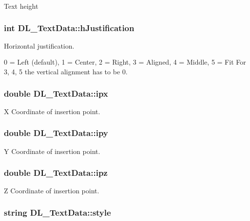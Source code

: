 Text height \hypertarget{structDL__TextData_a9c6bfbf0d57c1b5d33714236ea6ffa56}{
\subsubsection[{h\-Justification}]{\setlength{\rightskip}{0pt plus 5cm}int D\-L\-\_\-\-Text\-Data\-::h\-Justification}}\label{structDL__TextData_a9c6bfbf0d57c1b5d33714236ea6ffa56}
Horizontal justification.

0 = Left (default), 1 = Center, 2 = Right, 3 = Aligned, 4 = Middle, 5 = Fit For 3, 4, 5 the vertical alignment has to be 0. \hypertarget{structDL__TextData_ae6ff4ccf2c0ec4d136b562ce8d5e4b6c}{
\subsubsection[{ipx}]{\setlength{\rightskip}{0pt plus 5cm}double D\-L\-\_\-\-Text\-Data\-::ipx}}\label{structDL__TextData_ae6ff4ccf2c0ec4d136b562ce8d5e4b6c}
X Coordinate of insertion point. \hypertarget{structDL__TextData_a6ea696600ce46b2c70ff8dc23dcddbb7}{
\subsubsection[{ipy}]{\setlength{\rightskip}{0pt plus 5cm}double D\-L\-\_\-\-Text\-Data\-::ipy}}\label{structDL__TextData_a6ea696600ce46b2c70ff8dc23dcddbb7}
Y Coordinate of insertion point. \hypertarget{structDL__TextData_a220516261158506c811d27b41bb0c22f}{
\subsubsection[{ipz}]{\setlength{\rightskip}{0pt plus 5cm}double D\-L\-\_\-\-Text\-Data\-::ipz}}\label{structDL__TextData_a220516261158506c811d27b41bb0c22f}
Z Coordinate of insertion point. \hypertarget{structDL__TextData_a205e68e10b0bc16f693b4a35cc6d2df0}{
\subsubsection[{style}]{\setlength{\rightskip}{0pt plus 5cm}string D\-L\-\_\-\-Text\-Data\-::style}}\label{structDL__TextData_a205e68e10b0bc16f693b4a35cc6d2df0}
